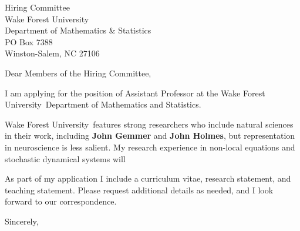 \documentclass[11pt,a4paper]{letter}
\begin{document}
\def\School{Wake Forest University}

\begin{letter}
{Hiring Committee\\
Wake Forest University\\
Department of Mathematics \& Statistics\\
PO Box 7388\\
Winston-Salem, NC 27106}


\opening{Dear Members of the Hiring Committee,}

I am applying for the position of Assistant Professor at the \School~Department of Mathematics and Statistics. 



\School~features strong researchers who include natural sciences in their work, including \textbf{John Gemmer} and \textbf{John Holmes}, but representation in neuroscience is less salient. My research experience in non-local equations and stochastic dynamical systems will 



As part of my application I include a curriculum vitae, research statement, and teaching statement. Please request additional details as needed, and I look forward to our correspondence.

\closing{Sincerely,}
\end{letter}
\end{document}
